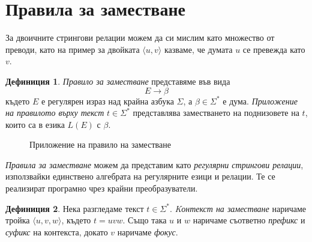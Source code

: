 \documentclass[12pt, oneside]{article}
\theoremstyle{definition}
\newtheorem{definition}{Дефиниция}[section]
\begin{document}
\pagebreak
\section{Правила за заместване}

За двоичните стрингови релации можем да си мислим като множество от преводи, като на пример за двойката \( \langle u, v \rangle \) казваме, че думата \( u \) се превежда като \( v \).

\begin{definition}
	\emph{Правило за заместване} представяме във вида
	\[ E \to \beta \]
	където \( E \) е регулярен израз над крайна азбука \( \Sigma \), а \( \beta \in \Sigma^* \) е дума.
	\emph{Приложение на правилото върху текст} \( t \in \Sigma^* \) представлява заместването на поднизовете на \( t \), които са в езика \( L(E) \) с \( \beta \).
\end{definition}

\begin{figure}[!htb]
	\centering
	\caption{Приложение на правило на заместване}
\end{figure}

\noindent \emph{Правила за заместване} можем да представим като \emph{регулярни стрингови релации}, използвайки единствено алгебрата на регулярните езици и релации. Те се реализират програмно чрез крайни преобразуватели. \cite{Kaplan&Kay:94}

\begin{definition}
	Нека разгледаме текст \( t \in \Sigma^* \). \emph{Kонтекст на заместване} наричаме тройка \( \langle u,v,w \rangle \), където \( t = uvw \). Също така \( u \) и \( w \) наричаме съответно \emph{префикс} и \emph{суфикс} на контекста, докато \( v \) наричаме \emph{фокус}.
\end{definition}
\end{document}

